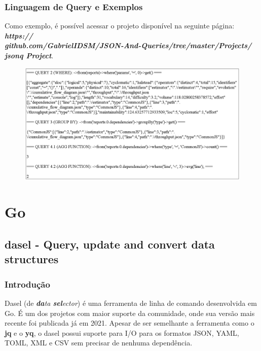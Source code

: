 \documentclass[a4paper, 12pt] {article}
\begin{document}
			\subsubsection{Linguagem de Query e Exemplos}
				Como exemplo, é possível acessar o projeto disponível na seguinte página: \textbf{\textit{https://\\github.com/GabrielIDSM/JSON-And-Queries/tree/master/Projects/\\jsonq Project}}.
			\begin{figure}[H]
				\centering
				\includegraphics[width=16cm]{jsonq.png}
				\label{figure:Image}
			\end{figure}

	\newpage \section{Go}
		\subsection{dasel - Query, update and convert data structures}
			\subsubsection{Introdução}
				Dasel (de \textit{\textbf{da}ta \textbf{sel}ector}) é uma ferramenta de linha de comando desenvolvida em Go. É um dos projetos com maior suporte da comunidade, onde sua versão mais recente foi publicada já em 2021. Apesar de ser semelhante a ferramenta como o \textbf{jq} e o \textbf{yq}, o dasel possui suporte para I/O para os formatos JSON, YAML, TOML, XML e CSV sem precisar de nenhuma dependência.
\end{document}

